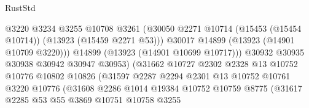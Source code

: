 \begin{lexlean}{RustStd}
\begin{coremodule}
                                          @3220
                                          @3234
                                          @3255
                                          @10708
                                          @3261
                                          (@30050
                                            @2271
                                            @10714
                                            (@15453 (@15454 @10714))
                                            (@13923 (@15459 @2271 @53)))
                                          @30017
                                          @14899
                                          (@13923 (@14901 @10709 @3220)))
                                        @14899
                                        (@13923 (@14901 @10699 @10717)))
                                      @30932
                                      @30935
                                      @30938
                                      @30942
                                      @30947
                                      @30953)
                                    (@31662
                                      @10727
                                      @2302
                                      @2328
                                      @13
                                      @10752
                                      @10776
                                      @10802
                                      @10826
                                      (@31597
                                        @2287
                                        @2294
                                        @2301
                                        @13
                                        @10752
                                        @10761
                                        @3220
                                        @10776
                                        (@31608
                                          @2286
                                          @1014
                                          @19384
                                          @10752
                                          @10759
                                          @8775
                                          (@31617
                                            @2285
                                            @53
                                            @55
                                            @3869
                                            @10751
                                            @10758
                                            @3255

\end{coremodule}
\end{lexlean}
